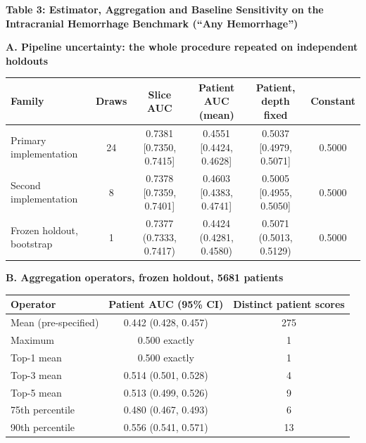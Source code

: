 \documentclass[11pt,letterpaper]{article}
\begin{document}
\clearpage
\begin{singlespace}
\footnotesize

\textbf{Table 3: Estimator, Aggregation and Baseline Sensitivity on the
Intracranial Hemorrhage Benchmark (``Any Hemorrhage'')}

\vspace{0.5em}

\textbf{A. Pipeline uncertainty: the whole procedure repeated on independent holdouts}

\vspace{0.3em}

\setlength{\tabcolsep}{4pt}
\begin{tabular}{lccccc}
\toprule
Family & Draws & Slice AUC & Patient AUC (mean) & Patient, depth fixed & Constant\\
\midrule
Primary implementation & 24 & 0.7381 [0.7350, 0.7415] & 0.4551 [0.4424, 0.4628] & 0.5037 [0.4979, 0.5071] & 0.5000\\
Second implementation & 8 & 0.7378 [0.7359, 0.7401] & 0.4603 [0.4383, 0.4741] & 0.5005 [0.4955, 0.5050] & 0.5000\\
\midrule
Frozen holdout, bootstrap & 1 & 0.7377 (0.7333, 0.7417) & 0.4424 (0.4281, 0.4580) & 0.5071 (0.5013, 0.5129) & 0.5000\\
\bottomrule
\end{tabular}

\vspace{0.6em}

\textbf{B. Aggregation operators, frozen holdout, \num{5681} patients}

\vspace{0.3em}

\begin{tabular}{lcc}
\toprule
Operator & Patient AUC (95\% CI) & Distinct patient scores\\
\midrule
Mean (pre-specified)   & 0.442 (0.428, 0.457) & 275\\
Maximum                & 0.500 exactly        & 1\\
Top-1 mean             & 0.500 exactly        & 1\\
Top-3 mean             & 0.514 (0.501, 0.528) & 4\\
Top-5 mean             & 0.513 (0.499, 0.526) & 9\\
75th percentile        & 0.480 (0.467, 0.493) & 6\\
90th percentile        & 0.556 (0.541, 0.571) & 13\\
\bottomrule
\end{tabular}


\end{singlespace}
\end{document}
